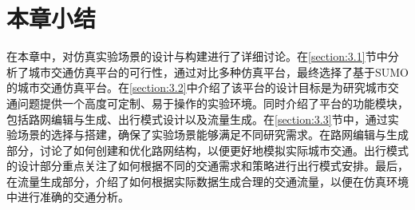\section{本章小结}

在本章中，对仿真实验场景的设计与构建进行了详细讨论。在\ref{section:3.1}节中分析了城市交通仿真平台的可行性，通过对比多种仿真平台，最终选择了基于SUMO的城市交通仿真平台。在\ref{section:3.2}中介绍了该平台的设计目标是为研究城市交通问题提供一个高度可定制、易于操作的实验环境。同时介绍了平台的功能模块，包括路网编辑与生成、出行模式设计以及流量生成。在\ref{section:3.3}节中，通过实验场景的选择与搭建，确保了实验场景能够满足不同研究需求。在路网编辑与生成部分，讨论了如何创建和优化路网结构，以便更好地模拟实际城市交通。出行模式的设计部分重点关注了如何根据不同的交通需求和策略进行出行模式安排。最后，在流量生成部分，介绍了如何根据实际数据生成合理的交通流量，以便在仿真环境中进行准确的交通分析。

